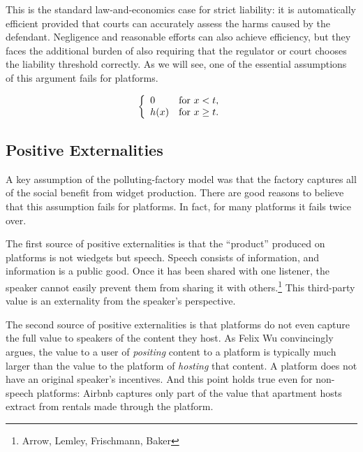 This is the standard law-and-economics case for strict liability: it is automatically efficient provided that courts can accurately assess the harms caused by the defendant. Negligence and reasonable efforts can also achieve efficiency, but they faces the additional burden of also requiring that the regulator or court chooses the liability threshold correctly. As we will see, one of the essential assumptions of this argument fails for platforms.


\begin{equation}
\left\{\begin{array}{ll}
    0 & \mbox{for $x <t$}, \\
    h(x) & \mbox{for $x \ge t$}.
\end{array}\right.
\end{equation}


\subsection{Positive Externalities}

A key assumption of the polluting-factory model was that the factory captures all of the social benefit from widget production. There are good reasons to believe that this assumption fails for platforms. In fact, for many platforms it fails twice over.

The first source of positive externalities is that the ``product'' produced on platforms is not wiedgets but speech. Speech consists of information, and information is a public good. Once it has been shared with one listener, the speaker cannot easily prevent them from sharing it with others.\footnote{Arrow, Lemley, Frischmann, Baker} This third-party value is an externality from the speaker's perspective.

The second source of positive externalities is that platforms do not even capture the full value to speakers of the content they host. As Felix Wu convincingly argues, the value to a user of \emph{positing} content to a platform is typically much larger than the value to the platform of \emph{hosting} that content. A platform does not have an original speaker's incentives. And this point holds true even for non-speech platforms: Airbnb captures only part of the value that apartment hosts extract from rentals made through the platform.

